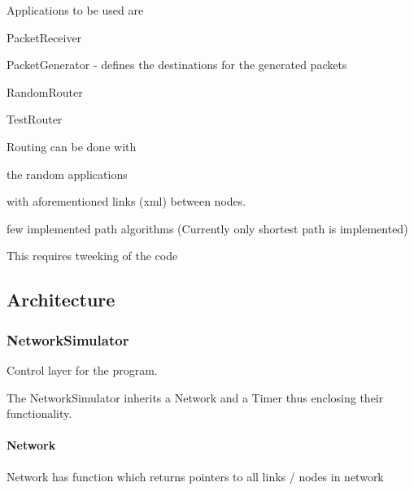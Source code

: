 \begin{DoxyItemize}
\item Applications to be used are
\begin{DoxyItemize}
\item Packet\+Receiver
\item Packet\+Generator -\/ defines the destinations for the generated packets
\item Random\+Router
\item Test\+Router
\end{DoxyItemize}
\item Routing can be done with
\begin{DoxyItemize}
\item the random applications
\item with aforementioned links (xml) between nodes.
\item few implemented path algorithms (Currently only shortest path is implemented)
\begin{DoxyItemize}
\item This requires tweeking of the code 


\end{DoxyItemize}
\end{DoxyItemize}
\end{DoxyItemize}

\subsection*{Architecture}

\subsubsection*{Network\+Simulator}


\begin{DoxyItemize}
\item Control layer for the program.
\item The Network\+Simulator inherits a Network and a Timer thus enclosing their functionality.
\end{DoxyItemize}

\paragraph*{Network}


\begin{DoxyItemize}
\item Network has function which returns pointers to all links / nodes in network
\end{DoxyItemize}

